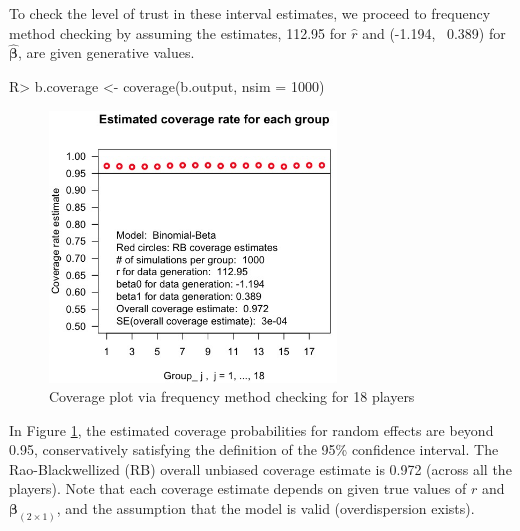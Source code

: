\documentclass[article]{jss}
\begin{document}
To check the level of trust in these interval estimates, we  proceed to frequency method checking by assuming the estimates, 112.95 for $\hat{r}$ and (-1.194, ~0.389) for $\hat{\boldsymbol{\beta}}$, are given generative values. 

\begin{CodeChunk}
\begin{CodeInput}
R> b.coverage <- coverage(b.output, nsim = 1000) 
\end{CodeInput}
\end{CodeChunk}
\begin{figure}[h!]
\begin{center}
\includegraphics[width = 3in]{baseball2.png}
\caption{Coverage plot via frequency method checking for 18 players}
\label{fig:baseball2}
\end{center}
\end{figure}



In Figure \ref{fig:baseball2},  the estimated coverage probabilities for random effects are beyond 0.95, conservatively satisfying the definition of the 95\% confidence interval. The Rao-Blackwellized (RB) overall unbiased coverage estimate is 0.972 (across all the players). Note that each coverage estimate depends on given true values of $r$ and $\boldsymbol{\beta}_{(2\times1)}$, and the assumption that the model is valid (overdispersion exists).
\end{document}
